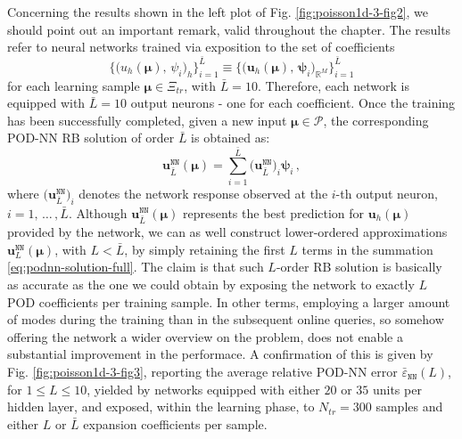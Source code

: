 \documentclass[12pt, a4paper, twoside, openright, notitlepage]{report}
\numberwithin{equation}{chapter}
\theoremstyle{theorem}
\theoremstyle{definition}
\theoremstyle{remark}
\theoremstyle{proposition}
\numberwithin{figure}{chapter}
\newcommand{\bg}[1]{\boldsymbol{#1}}
\begin{document}
		Concerning the results shown in the left plot of Fig. \ref{fig:poisson1d-3-fig2}, we should point out an important remark, valid throughout the chapter. The results refer to neural networks trained via exposition to the set of coefficients \[ \big\lbrace \big( u_h(\bg{\mu}), \, \psi_i \big)_h \big\rbrace_{i = 1}^{\scriptscriptstyle{\bar{L}}} \equiv \big\lbrace \big( \mathbf{u}_h(\bg{\mu}), \, \bg{\psi}_i \big)_{\mathbb{R}^M} \big\rbrace_{i = 1}^{\scriptscriptstyle{\bar{L}}} \] for each learning sample $\bg{\mu} \in \Xi_{tr}$, with $\bar{L} = 10$. Therefore, each network is equipped with $\bar{L} = 10$ output neurons - one for each coefficient. Once the training has been successfully completed, given a new input $\bg{\mu} \in \mathcal{P}$, the corresponding POD-NN RB solution of order $\bar{L}$ is obtained as:
		\begin{equation}
			\label{eq:podnn-solution-full}
			\mathbf{u}_{\bar{L}}^{\texttt{NN}}(\bg{\mu}) = \sum_{i = 1}^{\bar{L}} \big( \mathbf{u}_{\bar{L}}^{\texttt{NN}} \big)_i \bg{\psi}_i \, ,
		\end{equation} 
		where $\big( \mathbf{u}_{\bar{L}}^{\texttt{NN}} \big)_i$ denotes the network response observed at the $i$-th output neuron, $i = 1, \, \ldots \, , \bar{L}$. Although $\mathbf{u}_{\bar{L}}^{\texttt{NN}}(\bg{\mu})$ represents the best prediction for $\mathbf{u}_h(\bg{\mu})$ provided by the network, we can as well construct lower-ordered approximations $\mathbf{u}_L^{\texttt{NN}}(\bg{\mu})$, with $L < \bar{L}$, by simply retaining the first $L$ terms in the summation \eqref{eq:podnn-solution-full}. The claim is that such $L$-order RB solution is basically as accurate as the one we could obtain by exposing the network to exactly $L$ POD coefficients per training sample. In other terms, employing a larger amount of modes during the training than in the subsequent online queries, so somehow offering the network a wider overview on the problem, does not enable a substantial improvement in the performace. A confirmation of this is given by Fig. \ref{fig:poisson1d-3-fig3}, reporting the average relative POD-NN error $\bar{\varepsilon}_{\texttt{NN}}^{}(L)$, for $1 \leq L \leq 10$, yielded by networks equipped with either $20$ or $35$ units per hidden layer, and exposed, within the learning phase, to $N_{tr} = 300$ samples and either $L$ or $\bar{L}$ expansion coefficients per sample.
		
\end{document}
